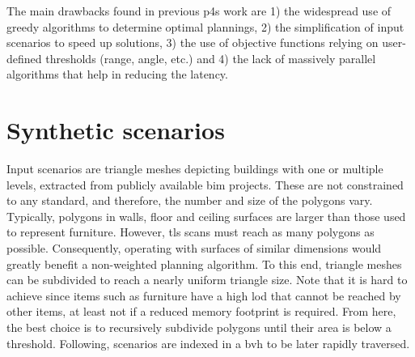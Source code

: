 The main drawbacks found in previous \acrshort{p4s} work are 1) the widespread use of greedy algorithms to determine optimal plannings, 2) the simplification of input scenarios to speed up solutions, 3) the use of objective functions relying on user-defined thresholds (range, angle, etc.) and 4) the lack of massively parallel algorithms that help in reducing the latency. 

\section{Synthetic scenarios}

Input scenarios are triangle meshes depicting buildings with one or multiple levels, extracted from publicly available \acrshort{bim} projects. These are not constrained to any standard, and therefore, the number and size of the polygons vary. Typically, polygons in walls, floor and ceiling surfaces are larger than those used to represent furniture. However, \acrshort{tls} scans must reach as many polygons as possible. Consequently, operating with surfaces of similar dimensions would greatly benefit a non-weighted planning algorithm. To this end, triangle meshes can be subdivided to reach a nearly uniform triangle size. Note that it is hard to achieve since items such as furniture have a high \acrshort{lod} that cannot be reached by other items, at least not if a reduced memory footprint is required. From here, the best choice is to recursively subdivide polygons until their area is below a threshold. Following, scenarios are indexed in a \acrshort{bvh} to be later rapidly traversed.

